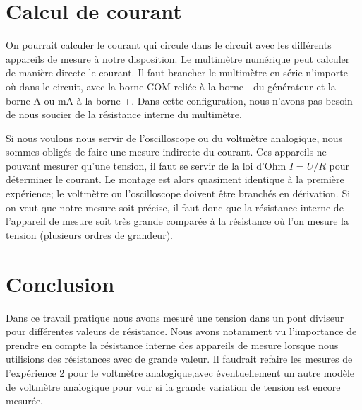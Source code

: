 \documentclass[10pt]{article}
\begin{document}
\section{Calcul de courant}


	On pourrait calculer le courant qui circule dans le circuit avec les différents appareils de mesure à notre disposition. 
    Le multimètre numérique peut calculer de manière directe le courant. Il faut brancher le multimètre en série n'importe où dans le circuit, 
    avec la borne COM reliée  à la borne - du générateur et la borne A ou mA à la borne +. Dans cette configuration, nous n'avons pas besoin de nous soucier de la résistance interne 
    du multimètre.


	Si nous voulons nous servir de l'oscilloscope ou du voltmètre analogique, nous sommes obligés de faire une mesure indirecte du courant. 
    Ces appareils ne pouvant mesurer qu'une tension, il faut se servir de la loi d'Ohm $I=U/R$ pour déterminer le courant. 
    Le montage est alors quasiment identique à la première expérience; le voltmètre ou l'oscilloscope doivent être branchés en dérivation. 
    Si on veut que notre mesure soit précise, il faut donc que la résistance interne de l'appareil de mesure soit très grande comparée à la résistance où l'on mesure la tension 
    (plusieurs ordres de grandeur). 

\section{Conclusion}
Dans ce travail pratique nous avons mesuré une tension dans un pont diviseur pour différentes valeurs de résistance. Nous avons notamment vu l'importance de prendre en compte la résistance interne des appareils de mesure lorsque nous utilisions des résistances avec de grande valeur. Il faudrait refaire les mesures de l'expérience 2 pour le voltmètre analogique,avec éventuellement un autre modèle de voltmètre analogique pour voir si la grande variation de tension est encore mesurée. 
\end{document}
